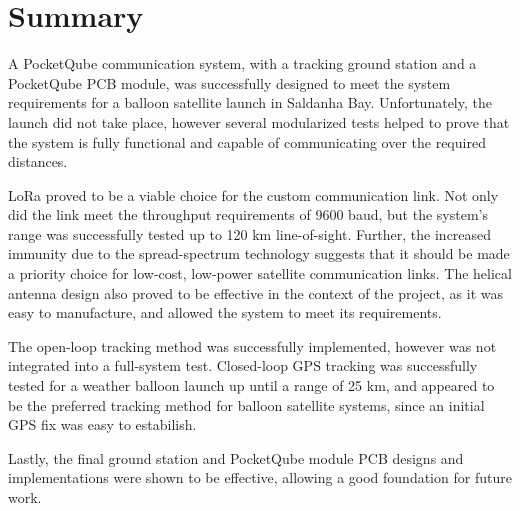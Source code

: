 \section{Summary}

A PocketQube communication system, with a tracking ground station and a PocketQube PCB module, was successfully designed to meet the system requirements for a balloon satellite launch in Saldanha Bay. Unfortunately, the launch did not take place, however several modularized tests helped to prove that the system is fully functional and capable of communicating over the required distances.

LoRa proved to be a viable choice for the custom communication link. Not only did the link meet the throughput requirements of 9600 baud, but the system's range was successfully tested up to 120 km line-of-sight. Further, the increased immunity due to the spread-spectrum technology suggests that it should be made a priority choice for low-cost, low-power satellite communication links. The helical antenna design also proved to be effective in the context of the project, as it was easy to manufacture, and allowed the system to meet its requirements.

The open-loop tracking method was successfully implemented, however was not integrated into a full-system test. Closed-loop GPS tracking was successfully tested for a weather balloon launch up until a range of 25 km, and appeared to be the preferred tracking method for balloon satellite systems, since an initial GPS fix was easy to estabilish.

Lastly, the final ground station and PocketQube module PCB designs and implementations were shown to be effective, allowing a good foundation for future work.